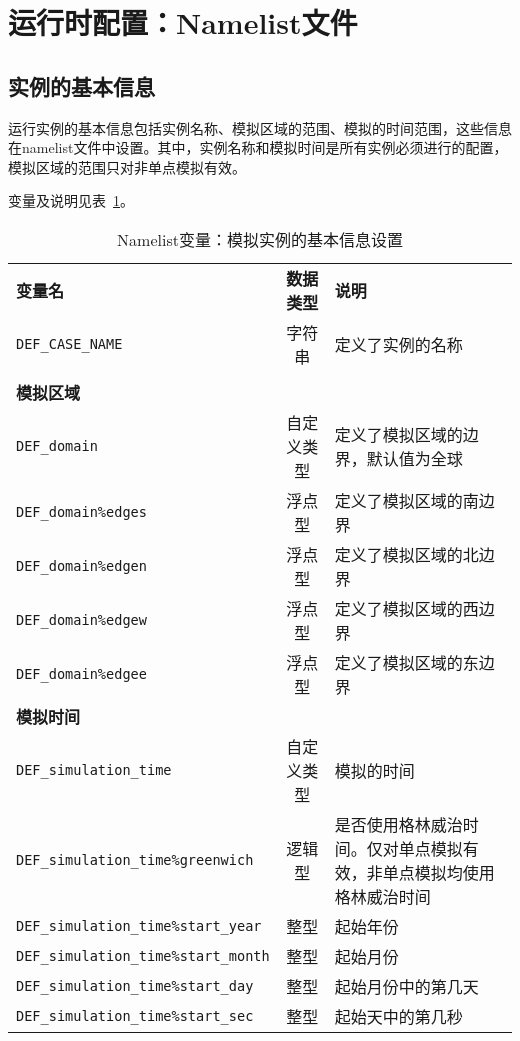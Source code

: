 \section{运行时配置：Namelist文件}\label{nml}

\subsection{实例的基本信息}
运行实例的基本信息包括实例名称、模拟区域的范围、模拟的时间范围，这些信息在namelist文件中设置。其中，实例名称和模拟时间是所有实例必须进行的配置，模拟区域的范围只对非单点模拟有效。

变量及说明见表~\ref{table_nl_basic}。

\begin{table}[!htbp] \small
\caption{Namelist变量：模拟实例的基本信息设置} \label{table_nl_basic}
\centering \renewcommand{\arraystretch}{1.2}
\begin{tabular}{lcp{}}
\toprule
\textbf{变量名} & \textbf{数据类型} & \textbf{说明} \\
\texttt{DEF\_CASE\_NAME} & 字符串 & 定义了实例的名称 \\
 \\\midrule
\textbf{模拟区域} && \\
\texttt{DEF\_domain} & 自定义类型 & 定义了模拟区域的边界，默认值为全球 \\
\texttt{DEF\_domain\%edges} & 浮点型 & 定义了模拟区域的南边界 \\
\texttt{DEF\_domain\%edgen} & 浮点型 & 定义了模拟区域的北边界 \\
\texttt{DEF\_domain\%edgew} & 浮点型 & 定义了模拟区域的西边界 \\
\texttt{DEF\_domain\%edgee} & 浮点型 & 定义了模拟区域的东边界 \\\midrule
\textbf{模拟时间} && \\
\texttt{DEF\_simulation\_time} & 自定义类型 & 模拟的时间 \\
\texttt{DEF\_simulation\_time\%greenwich} & 逻辑型 & 是否使用格林威治时间。仅对单点模拟有效，非单点模拟均使用格林威治时间 \\
\texttt{DEF\_simulation\_time\%start\_year} & 整型 & 起始年份 \\
\texttt{DEF\_simulation\_time\%start\_month} & 整型 & 起始月份 \\
\texttt{DEF\_simulation\_time\%start\_day} & 整型 & 起始月份中的第几天 \\
\texttt{DEF\_simulation\_time\%start\_sec} & 整型 & 起始天中的第几秒 \\

\end{tabular}
\end{table}
